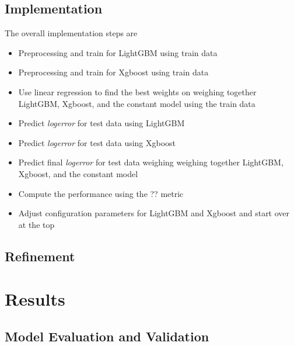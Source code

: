 \documentclass[a4paper]{article}
\begin{document}
\subsection{Implementation}
The overall implementation steps are
\begin{itemize}
    \item Preprocessing and train for LightGBM using train data
    \item Preprocessing and train for Xgboost using train data
    \item Use linear regression to find the best weights on weighing together LightGBM, Xgboost, and the constant
        model using the train data
    \item Predict \textit{logerror} for test data using LightGBM
    \item Predict \textit{logerror} for test data using Xgboost
    \item Predict final \textit{logerror} for test data weighing weighing together LightGBM, Xgboost, and the
        constant model
    \item Compute the performance using the ?? metric
    \item Adjust configuration parameters for LightGBM and Xgboost and start over at the top
\end{itemize}


\subsection{Refinement}

\section{Results}

\subsection{Model Evaluation and Validation}
\end{document}

